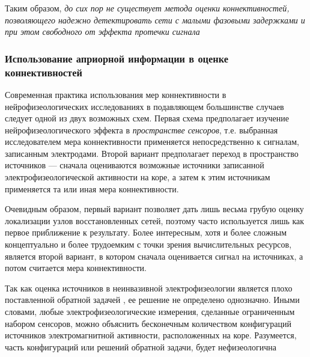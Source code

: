 Таким образом, \emph{до сих пор не существует метода оценки коннективностей, 
позволяющего надежно детектировать сети с малыми фазовыми задержками и при этом свободного 
от эффекта протечки сигнала}


\subsubsection*{Использование априорной информации в оценке коннективностей}

Современная практика использования мер коннективности в нейрофизеологических 
исследованиях в подавляющем большинстве случаев следует одной из двух возможных схем.
Первая схема предполагает изучение нейрофизеологического эффекта  в \emph{пространстве сенсоров},
т.е. выбранная исследователем мера коннективности применяется непосредственно к сигналам, 
записанным электродами. 
Второй вариант предполагает переход в пространство источников --- сначала оцениваются 
возможные источники записанной электрофизеологической активности на коре, а затем к этим 
источникам применяется та или иная  мера коннективности.

Очевидным образом, первый вариант позволяет дать лишь весьма грубую оценку локализации 
узлов восстановленных сетей, поэтому часто используется лишь как первое приближение к результату.
Более интересным, хотя и более сложным концептуально и более 
трудоемким с точки зрения вычислительных ресурсов, является второй вариант, в котором 
сначала оценивается сигнал на источниках, а потом считается мера коннективности.

Так как оценка источников в неинвазивной электрофизеологии является
плохо поставленной обратной задачей , 
ее решение не определено однозначно. Иными словами, любые электрофизеологические измерения, 
сделанные ограниченным набором сенсоров, можно объяснить бесконечным количеством конфигураций 
источников электромагнитной активности, расположенных на коре. Разумеется, часть конфигураций 
или решений обратной задачи, будет нефизеологична







